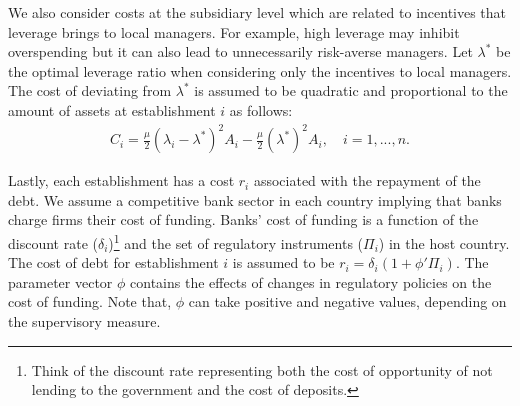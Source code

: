 \documentclass[12pt]{article}
\begin{document}
	We also consider costs at the subsidiary level which are related to incentives that leverage brings to local managers. For example, high leverage may inhibit overspending but it can also lead to unnecessarily risk-averse managers. Let $\lambda^*$ be the optimal leverage ratio when considering only the incentives to local managers. The cost of deviating from $\lambda^*$ is assumed to be quadratic and proportional to the amount of assets at establishment $i$ as follows:
	\begin{equation}
	\begin{aligned}
	C_i=\frac{\mu}{2}(\lambda_i-\lambda^*)^2A_i-\frac{\mu}{2}(\lambda^*)^2A_i, \quad i=1,...,n.
	\end{aligned}
	\label{eq:agency cost}
	\end{equation}	
		
	Lastly, each establishment has a cost $r_i$ associated with the repayment of the debt. We assume a competitive bank sector in each country implying that banks charge firms their cost of funding. Banks' cost of funding is a function of the discount rate ($\delta_i$)\footnote{Think of the discount rate representing both the cost of opportunity of not lending to the government and the cost of deposits.}  and the set of regulatory instruments ($\Pi_i$) in the host country. The cost of debt for establishment $i$ is assumed to be $r_i=\delta_i(1+\phi'\Pi_i)$. The parameter vector $\phi$ contains the effects of changes in regulatory policies on the cost of funding. Note that, $\phi$ can take positive and negative values, depending on the supervisory measure.
	
\end{document}
